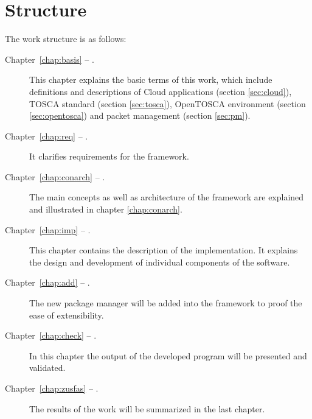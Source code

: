\section*{Structure}
The work structure is as follows:
\begin{description}
\item[Chapter~\ref{chap:basis} -- .] This chapter explains the basic terms of this work, which include definitions and descriptions of Cloud applications (section \ref{sec:cloud}), TOSCA standard (section \ref{sec:tosca}), OpenTOSCA environment  (section \ref{sec:opentosca}) and packet management (section \ref{sec:pm}).
\item[Chapter~\ref{chap:req} -- .] It clarifies requirements for the framework.
\item[Chapter~\ref{chap:conarch} -- .] The main concepts as well as architecture of the framework are explained and illustrated in chapter \ref{chap:conarch}.
\item[Chapter~\ref{chap:imp} -- .] This chapter contains the description of the implementation.
 It explains the design and development of individual components of the software. 
\item[Chapter~\ref{chap:add} -- .] The new package manager will be added into the framework to proof the ease of extensibility. 
\item[Chapter~\ref{chap:check} -- .] In this chapter the output of the developed program will be presented and validated.
\item[Chapter~\ref{chap:zusfas} -- .] The results of the work will be summarized in the last chapter.
\end{description}
